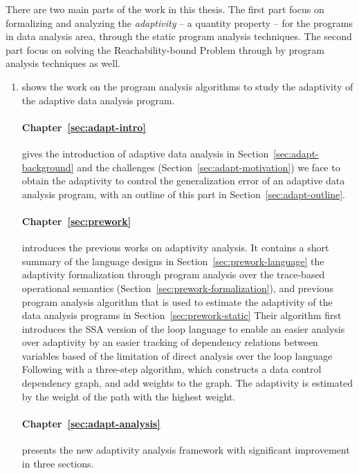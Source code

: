 There are two main parts of the work in this thesis.
The first part focus on formalizing and analyzing the \emph{adaptivity} -- a quantity property -- for the programs in data analysis area,
through the static program analysis techniques.
The second part focus on solving the Reachability-bound Problem through by program analysis techniques as well.
\begin{enumerate}

    \item {}
    shows the work on the program analysis algorithms to study the adaptivity of the adaptive data analysis program.    

    \paragraph{Chapter~\ref{sec:adapt-intro}} gives the introduction of adaptive data analysis in Section~\ref{sec:adapt-background} and the challenges (Section~\ref{sec:adapt-motivation}) we face to obtain the adaptivity to control the generalization error of an adaptive data analysis program, with an outline of this part in Section~\ref{sec:adapt-outline}.
    
    \paragraph{Chapter~\ref{sec:prework}} introduces the previous works on adaptivity analysis.
    It contains a short summary of the language designs in Section~\ref{sec:prework-language} 
    the adaptivity formalization through program analysis over the trace-based operational semantics (Section~\ref{sec:prework-formalization}),
    and previous program analysis algorithm that is used to estimate the adaptivity of the data analysis programs 
    in Section~\ref{sec:prework-static}
    Their algorithm first introduces the SSA version of the loop language
    to enable an easier analysis over adaptivity by an easier tracking of dependency relations between variables based of the limitation of direct analysis over the loop language
    Following with a three-step algorithm, which constructs a data control dependency graph, and add weights to the graph. The adaptivity is estimated by the weight of the path with the highest weight.


    \paragraph*{Chapter~\ref{sec:adapt-analysis}} presents the new adaptivity analysis framework with significant improvement in three sections.
    

\end{enumerate}
